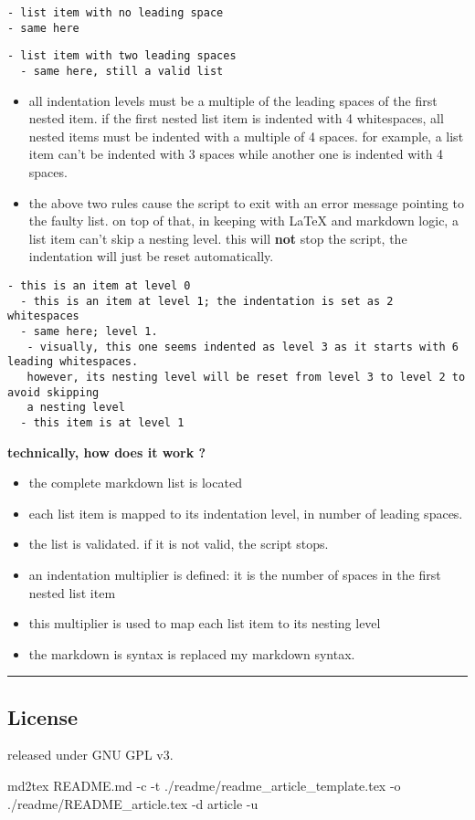 \begin{Verbatim}[breaklines=true]
- list item with no leading space
- same here
\end{Verbatim}

\begin{Verbatim}[breaklines=true]
  - list item with two leading spaces
  - same here, still a valid list
\end{Verbatim}

\begin{itemize}
\item all indentation levels must be a multiple of the leading spaces of the first nested item. if the first nested list item is indented with 4 whitespaces, all nested items must be indented with a multiple of 4 spaces. for example, a list item can't be indented with 3 spaces while another one is indented with 4 spaces. 
\end{itemize}

\begin{itemize}
\item the above two rules cause the script to exit with an error message pointing to the faulty list. on top of that, in keeping with LaTeX and markdown logic, a list item can't skip a nesting level. this will \textbf{not} stop the script, the indentation will just be reset automatically. 
\end{itemize}

\begin{Verbatim}[breaklines=true]
- this is an item at level 0
  - this is an item at level 1; the indentation is set as 2 whitespaces
  - same here; level 1.
   - visually, this one seems indented as level 3 as it starts with 6 leading whitespaces.
   however, its nesting level will be reset from level 3 to level 2 to avoid skipping
   a nesting level
  - this item is at level 1
\end{Verbatim}

\textbf{technically, how does it work ?}

\begin{itemize}
\item the complete markdown list is located
\item each list item is mapped to its indentation level, in number of leading spaces.
\item the list is validated. if it is not valid, the script stops.
\item an indentation multiplier is defined: it is the number of spaces in the first nested list item
\item this multiplier is used to map each list item to its nesting level
\item the markdown is syntax is replaced my markdown syntax. 
\end{itemize}

\par\noindent\rule{\linewidth}{0.4pt}
\subsection{License}

released under GNU GPL v3.

md2tex README.md -c -t ./readme/readme\_article\_template.tex -o ./readme/README\_article.tex -d article -u
